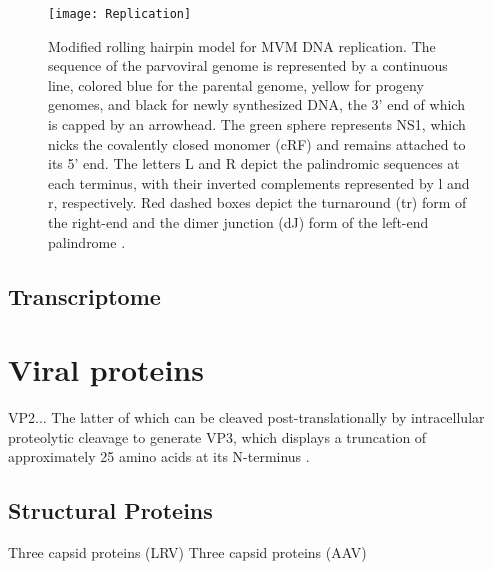 \cite{pmid967244, pmid3973977, pmid3296697, pmid8995615}         


\begin{figure}[t]
\centering
  \texttt{[image: Replication]}
  \caption[Rolling hairpin replication (RHR)]
   {Modified rolling hairpin model for MVM DNA replication. The sequence of the parvoviral genome is represented by a continuous line, colored blue for the parental genome, yellow for progeny genomes, and black for newly synthesized DNA, the 3’ end of which is capped by an arrowhead. The green sphere represents NS1, which nicks the covalently closed monomer (cRF) and remains attached to its 5’ end. The letters L and R depict the palindromic sequences at each terminus, with their inverted complements represented by l and r, respectively. Red dashed boxes depict the turnaround (tr) form of the right-end and the dimer junction (dJ) form of the left-end palindrome \cite{els}. 
} 
\label{RHR}
\end{figure}


\subsection{Transcriptome}

\section{Viral proteins}


VP2...
The latter of which can be cleaved post-translationally by intracellular proteolytic cleavage to generate VP3, which displays a truncation of approximately 25 amino acids at its N-terminus \cite{pmid864702, pmid1448928, pmid9770425}. 


\subsection{Structural Proteins}

Three capsid proteins (LRV) \cite{pmid4321164}
Three capsid proteins (AAV) \cite{pmid5132697, pmid5172922}



